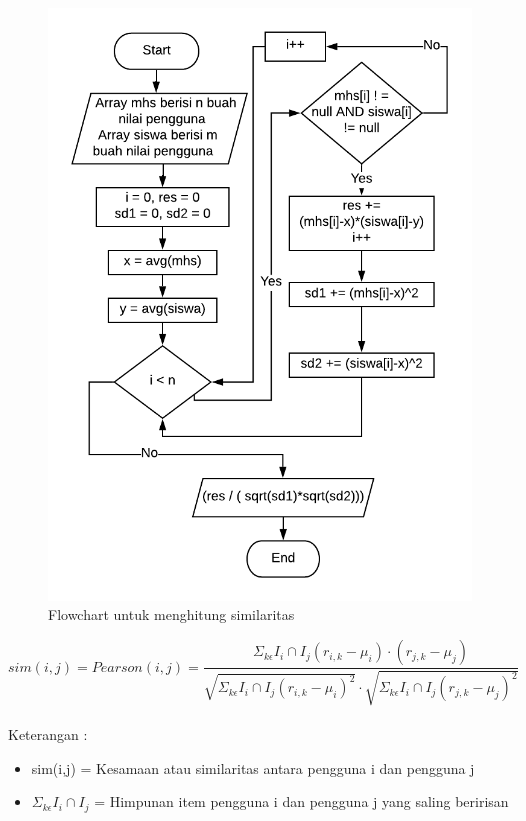 \documentclass[a4paper,twoside]{article}
\begin{document}
\begin{enumerate}
\begin{enumerate}
	
	\begin{figure}[H]
		\centering
		\includegraphics[scale=0.6]{pearson}
		\caption{Flowchart untuk menghitung similaritas}
	\end{figure}
	
	\begin{equation}
		sim(i,j) = Pearson(i,j) = \frac{\Sigma _{k\epsilon} I_{i} \cap I_{j} (r_{i,k}-\mu_{i}) \cdot (r_{j,k}-\mu_{j})}{\sqrt{\Sigma _{k\epsilon} I_{i} \cap I_{j} (r_{i,k}-\mu_{i})^2} \cdot \sqrt{\Sigma _{k\epsilon} I_{i} \cap I_{j} (r_{j,k}-\mu_{j})^2 }}
	\end{equation}\leavevmode \\
	Keterangan : 
	\begin{itemize}
		\item sim(i,j) = Kesamaan atau similaritas antara pengguna i dan pengguna j
		
		\item $\Sigma _{k\epsilon} I_{i} \cap I_{j}$ = Himpunan item pengguna i dan pengguna j yang saling beririsan
		

\end{itemize}
\end{enumerate}
\end{enumerate}
\end{document}
